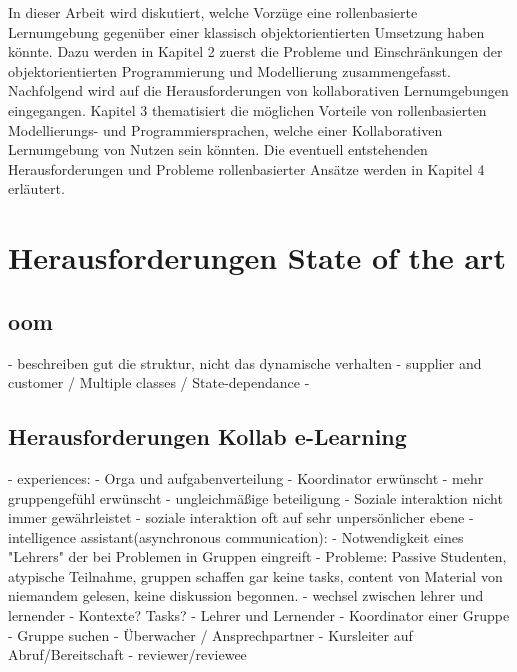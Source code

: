 \documentclass[conference]{IEEEtran}
\begin{document}


In dieser Arbeit wird diskutiert, welche Vorzüge eine rollenbasierte Lernumgebung gegenüber einer klassisch objektorientierten Umsetzung haben könnte. Dazu werden in Kapitel 2 zuerst die Probleme und Einschränkungen der objektorientierten Programmierung und Modellierung zusammengefasst. Nachfolgend wird auf die Herausforderungen von kollaborativen Lernumgebungen eingegangen. Kapitel 3 thematisiert die möglichen Vorteile von rollenbasierten Modellierungs- und Programmiersprachen, welche einer Kollaborativen Lernumgebung von Nutzen sein könnten. Die eventuell entstehenden Herausforderungen und Probleme rollenbasierter Ansätze werden in Kapitel 4 erläutert.



\section{Herausforderungen State of the art}
\subsection{oom}
- beschreiben gut die struktur, nicht das dynamische verhalten
- supplier and customer / Multiple classes / State-dependance
- 
\subsection{Herausforderungen Kollab e-Learning}
- experiences: 
	- Orga und aufgabenverteilung
	- Koordinator erwünscht
	- mehr gruppengefühl erwünscht
	- ungleichmäßige beteiligung
- Soziale interaktion nicht immer gewährleistet
	- soziale interaktion oft auf sehr unpersönlicher ebene
- intelligence assistant(asynchronous communication):
	- Notwendigkeit eines "Lehrers" der bei Problemen in Gruppen eingreift
		- Probleme: Passive Studenten, atypische Teilnahme, gruppen schaffen gar keine tasks, content von Material von niemandem gelesen, keine diskussion begonnen.
- wechsel zwischen lehrer und lernender
- Kontexte? Tasks?  
	- Lehrer und Lernender
	- Koordinator einer Gruppe
	- Gruppe suchen
	- Überwacher / Ansprechpartner
	- Kursleiter auf Abruf/Bereitschaft
	- reviewer/reviewee
\end{document}
